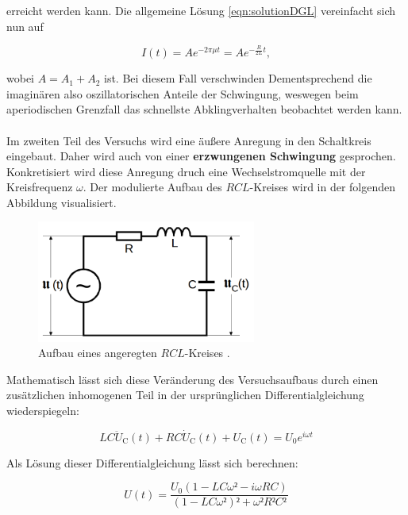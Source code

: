 \noindent erreicht werden kann. Die allgemeine Lösung \eqref{eqn:solutionDGL} vereinfacht sich nun auf 

\begin{equation*}
    I(t) = Ae^{-2\pi\mu{}t} = Ae^{-\frac{R}{2L}t},
\end{equation*}

\noindent wobei $A = A_1 + A_2$ ist. Bei diesem Fall verschwinden Dementsprechend die imaginären also oszillatorischen Anteile 
der Schwingung, weswegen beim aperiodischen Grenzfall das schnellste Abklingverhalten beobachtet werden kann.\\\\

\noindent Im zweiten Teil des Versuchs wird eine äußere Anregung in den Schaltkreis eingebaut. Daher wird auch von 
einer \textbf{erzwungenen Schwingung} gesprochen. Konkretisiert wird diese Anregung druch eine Wechselstromquelle mit 
der Kreisfrequenz $\omega$. Der modulierte Aufbau des $RCL$-Kreises wird in der folgenden Abbildung visualisiert.

\begin{figure}[H]
    \centering
    \includegraphics[height=4cm]{AnregungRCL.png}
    \caption{Aufbau eines angeregten $RCL$-Kreises \cite{Versuchsanleitung_v354}.}
    \label{fig:AnregungRCL}
\end{figure}

\noindent Mathematisch lässt sich diese Veränderung des Versuchsaufbaus durch einen zusätzlichen inhomogenen Teil in der 
ursprünglichen Differentialgleichung wiederspiegeln:

\begin{equation*}
    LC\ddot{U}_\text{C}(t) + RC\dot{U}_\text{C}(t) + U_\text{C}(t) = U_0e^{i\omega{}t}
\end{equation*}

\noindent Als Lösung dieser Differentialgleichung lässt sich berechnen:

\begin{equation*}
    U(t) = \frac{U_0\left(1 - LC\omega² - i\omega RC\right)}{\left(1 - LC\omega²\right)² + \omega²R²C²}
\end{equation*}

